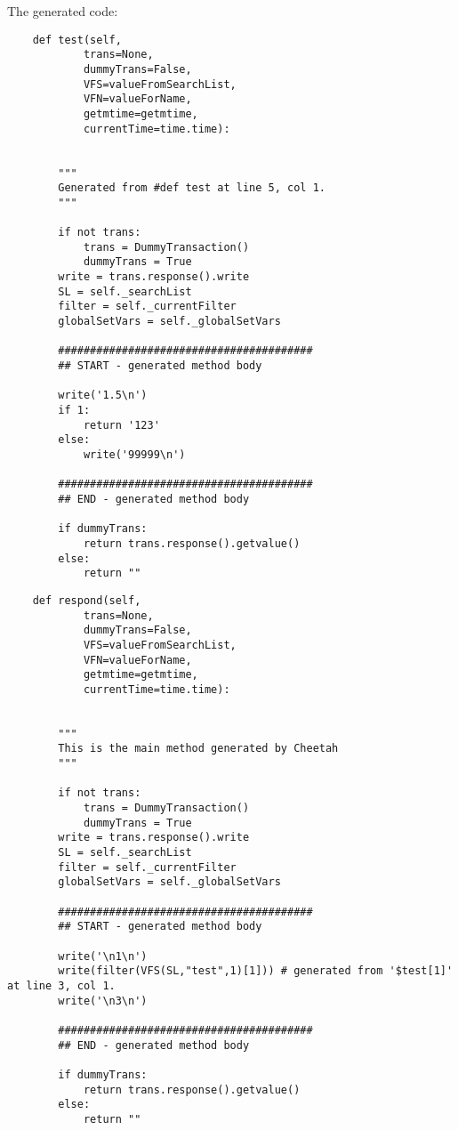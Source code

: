 The generated code:
\begin{verbatim}
    def test(self,
            trans=None,
            dummyTrans=False,
            VFS=valueFromSearchList,
            VFN=valueForName,
            getmtime=getmtime,
            currentTime=time.time):


        """
        Generated from #def test at line 5, col 1.
        """

        if not trans:
            trans = DummyTransaction()
            dummyTrans = True
        write = trans.response().write
        SL = self._searchList
        filter = self._currentFilter
        globalSetVars = self._globalSetVars
        
        ########################################
        ## START - generated method body
        
        write('1.5\n')
        if 1:
            return '123'
        else:
            write('99999\n')
        
        ########################################
        ## END - generated method body
        
        if dummyTrans:
            return trans.response().getvalue()
        else:
            return ""
\end{verbatim}
\begin{verbatim}        
    def respond(self,
            trans=None,
            dummyTrans=False,
            VFS=valueFromSearchList,
            VFN=valueForName,
            getmtime=getmtime,
            currentTime=time.time):


        """
        This is the main method generated by Cheetah
        """

        if not trans:
            trans = DummyTransaction()
            dummyTrans = True
        write = trans.response().write
        SL = self._searchList
        filter = self._currentFilter
        globalSetVars = self._globalSetVars
        
        ########################################
        ## START - generated method body
        
        write('\n1\n')
        write(filter(VFS(SL,"test",1)[1])) # generated from '$test[1]' at line 3, col 1.
        write('\n3\n')
        
        ########################################
        ## END - generated method body
        
        if dummyTrans:
            return trans.response().getvalue()
        else:
            return ""
\end{verbatim}


